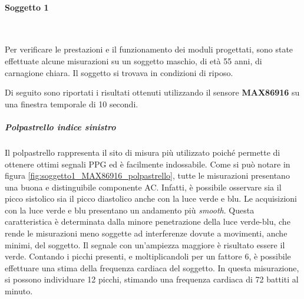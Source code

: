 \clearpage

\paragraph{Soggetto 1}~

\vspace{1cm}

\noindent Per verificare le prestazioni e il funzionamento dei moduli progettati, sono state effettuate alcune misurazioni su un soggetto maschio, di età 55 anni, di carnagione chiara. Il soggetto si trovava in condizioni di riposo.

\vspace{0.5cm}

\noindent Di seguito sono riportati i risultati ottenuti utilizzando il sensore \textbf{MAX86916} su una finestra temporale di 10 secondi.

\subparagraph{Polpastrello indice sinistro}

Il polpastrello rappresenta il sito di misura più utilizzato poiché permette di ottenere ottimi segnali PPG ed è facilmente indossabile. Come si può notare in figura \ref{fig:soggetto1_MAX86916_polpastrello}, tutte le misurazioni presentano una buona e distinguibile componente AC. Infatti, è possibile osservare sia il picco sistolico sia il picco diastolico anche con la luce verde e blu. Le acquisizioni con la luce verde e blu presentano un andamento più \textit{smooth}. Questa caratteristica è determinata dalla minore penetrazione della luce verde-blu, che rende le misurazioni meno soggette ad interferenze dovute a movimenti, anche minimi, del soggetto. Il segnale con un'ampiezza maggiore è risultato essere il verde. Contando i picchi presenti, e moltiplicandoli per un fattore 6, è possibile effettuare una stima della frequenza cardiaca del soggetto. In questa misurazione, si possono individuare 12 picchi, stimando una frequenza cardiaca di 72 battiti al minuto.

